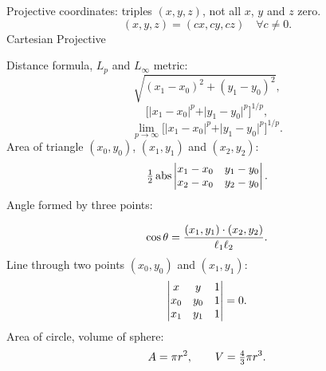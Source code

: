 Projective coordinates: triples $(x,y,z)$,
not all $x$, $y$ and $z$ zero.
$$(x,y,z) = (cx,cy,cz) \quad \forall c \neq 0.$$
Cartesian \qquad Projective
\Hrule
{}

Distance formula, $L_p$ and $L_\infty$ metric:
$$
\sqrt{(x_1 - x_0)^2 + (y_1 - y_0)^2},
$$
$$
\big[ \vert x_1 - x_0 \vert^p + \vert y_1 - y_0 \vert^p \big]^{1/p},
$$
$$
\lim_{p \to \infty} \big[ \vert x_1 - x_0 \vert^p + \vert y_1 - y_0 \vert^p \big]^{1/p}.
$$
Area of triangle $(x_0,y_0)$, $(x_1,y_1)$ and $(x_2,y_2)$:
$$
\sfrac 1 2
\abs
\left\vert \begin{matrix}
x_1-x_0 &y_1-y_0  \cr
x_2-x_0 &y_2-y_0  \cr
\end{matrix}\right\vert.
$$
Angle formed by three points:
\vskip3pt

$$
\cos \theta = {(x_1, y_1) \cdot (x_2, y_2) \over \ell_1 \ell_2}.
$$
Line through two points $(x_0,y_0)$ and $(x_1,y_1)$:
$$
\left\vert \begin{matrix}
x &y & 1\cr
x_0 &y_0 & 1\cr
x_1 &y_1 & 1\cr
\end{matrix}\right\vert = 0.
$$
Area of circle, volume of sphere:
$$ A= \pi r^2, \qquad V= \sfrac 4 3 \pi r^3.$$
